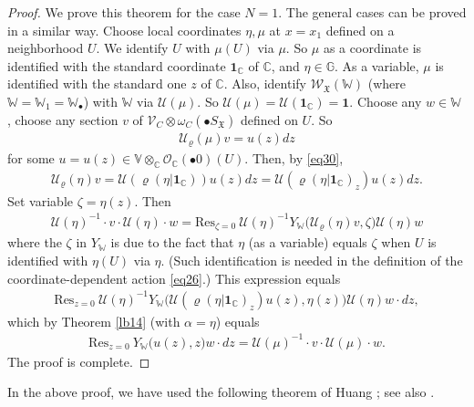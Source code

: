 \documentclass[11pt,b5paper,notitlepage]{article}
\theoremstyle{definition}
\theoremstyle{plain}
\newcommand{\fk}{\mathfrak}
\newcommand{\mc}{\mathcal}
\newcommand{\id}{\mathbf{1}}
\newcommand{\Res}{\mathrm{Res}}
\newcommand{\scr}{\mathscr}
\newcommand{\blt}{\bullet}
\newcommand{\Vbb}{\mathbb V}
\newcommand{\Wbb}{\mathbb W}
\newcommand{\Gbb}{\mathbb G}
\newcommand{\Cbb}{\mathbb C}
\numberwithin{equation}{section}
\begin{document}
\begin{proof}
We prove this theorem for the case $N=1$. The general cases can be proved in a similar way. Choose local coordinates $\eta,\mu$ at $x=x_1$ defined on a neighborhood $U$. We identify $U$ with $\mu(U)$ via $\mu$. So $\mu$ as a coordinate  is identified with the standard coordinate $\id_\Cbb$ of $\Cbb$, and $\eta\in\Gbb$. As a variable, $\mu$ is identified with the standard one $z$ of $\Cbb$. Also, identify $\scr W_{\fk X}(\Wbb)$ (where $\Wbb=\Wbb_1=\Wbb_\blt$) with $\Wbb$ via $\mc U(\mu)$. So $\mc U(\mu)=\mc U(\id_\Cbb)=\id$.  Choose any $w\in\Wbb$ , choose any section $v$ of $\scr V_C\otimes\omega_C(\blt S_{\fk X})$ defined on $U$. So
\begin{gather*}
\mc U_\varrho(\mu)v=u(z)dz
\end{gather*}
for some  $u=u(z)\in\Vbb\otimes_\Cbb\scr O_\Cbb(\blt 0)(U)$. Then, by \eqref{eq30},
	\begin{gather*}
	\mc U_\varrho(\eta)v=\mc U(\varrho(\eta|\id_\Cbb))u(z)dz=\mc U(\varrho(\eta|\id_\Cbb)_z)u(z)dz.
	\end{gather*}
Set variable $\zeta=\eta(z)$. Then
\begin{align*}
\mc U(\eta)^{-1}\cdot v\cdot\mc U(\eta)\cdot w=\Res_{\zeta=0}~\mc U(\eta)^{-1}Y_\Wbb\big(\mc U_\varrho(\eta)v,\zeta\big)\mc U(\eta)w
\end{align*}
where the $\zeta$ in $Y_\Wbb$ is due to the fact that $\eta$ (as a variable) equals $\zeta$ when $U$ is identified with $\eta(U)$ via $\eta$. (Such identification is needed in the definition of the coordinate-dependent action \eqref{eq26}.)  This expression equals
\begin{align*}
\Res_{z=0}~\mc U(\eta)^{-1}Y_\Wbb\big(\mc U(\varrho(\eta|\id_\Cbb)_z)u(z),\eta(z)\big)\mc U(\eta)w\cdot dz,
\end{align*}
which by Theorem \ref{lb14} (with $\alpha=\eta$) equals
	\begin{align*}
\Res_{z=0}~Y_\Wbb\big( u(z),z\big)w\cdot dz=\mc U(\mu)^{-1}\cdot v\cdot\mc U(\mu)\cdot w.
	\end{align*}
	The proof is complete.
\end{proof}



In the above proof, we have used the following theorem of Huang \cite{Hua97a}; see also \cite[Lemma 6.5.6]{FB04}.
\end{document}
